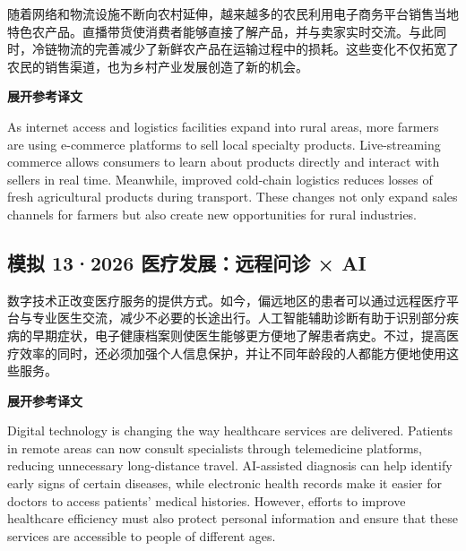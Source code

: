 \documentclass[a4paper,11pt,UTF8,fontset=none]{ctexart}
\begin{document}
\par

\noindent 随着网络和物流设施不断向农村延伸，越来越多的农民利用电子商务平台销售当地特色农产品。直播带货使消费者能够直接了解产品，并与卖家实时交流。与此同时，冷链物流的完善减少了新鲜农产品在运输过程中的损耗。这些变化不仅拓宽了农民的销售渠道，也为乡村产业发展创造了新的机会。\par

\noindent\colorbox{HeadBlue}{\strut {\bfseries 展开参考译文}}\par\vspace{1pt}

\noindent As internet access and logistics facilities expand into rural areas, more farmers are using e-commerce platforms to sell local specialty products. Live-streaming commerce allows consumers to learn about products directly and interact with sellers in real time. Meanwhile, improved cold-chain logistics reduces losses of fresh agricultural products during transport. These changes not only expand sales channels for farmers but also create new opportunities for rural industries.\par

\vspace{4pt}

\subsection{模拟 13·2026 医疗发展：远程问诊 × AI}

\par

\noindent 数字技术正改变医疗服务的提供方式。如今，偏远地区的患者可以通过远程医疗平台与专业医生交流，减少不必要的长途出行。人工智能辅助诊断有助于识别部分疾病的早期症状，电子健康档案则使医生能够更方便地了解患者病史。不过，提高医疗效率的同时，还必须加强个人信息保护，并让不同年龄段的人都能方便地使用这些服务。\par

\noindent\colorbox{HeadBlue}{\strut {\bfseries 展开参考译文}}\par\vspace{1pt}

\noindent Digital technology is changing the way healthcare services are delivered. Patients in remote areas can now consult specialists through telemedicine platforms, reducing unnecessary long-distance travel. AI-assisted diagnosis can help identify early signs of certain diseases, while electronic health records make it easier for doctors to access patients’ medical histories. However, efforts to improve healthcare efficiency must also protect personal information and ensure that these services are accessible to people of different ages.\par
\end{document}
